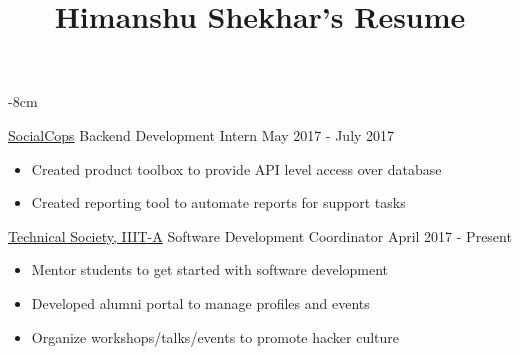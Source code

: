 \documentclass[10pt,a4paper]{altacv}
\begin{document}
\title{Himanshu Shekhar's Resume}

\begin{adjustwidth}{}{-8cm}
\makecvheader
\end{adjustwidth}


\cvproject
	{\href{https://socialcops.com}{SocialCops}}
    {Backend Development Intern}
    {May 2017 - July 2017}
\begin{itemize}
	\item {Created product toolbox to provide API level access over database}
    \item {Created reporting tool to automate reports for support tasks}
\end{itemize}

\divider

\cvproject 
	{\href{https://geekhaven.iiita.ac.in}{Technical Society, IIIT-A}}
    {Software Development Coordinator}
    {April 2017 - Present}
\begin{itemize}
	\item{Mentor students to get started with software development}
	\item{Developed alumni portal to manage profiles and events}
	\item{Organize workshops/talks/events to promote hacker culture}
\end{itemize}


\end{document}
